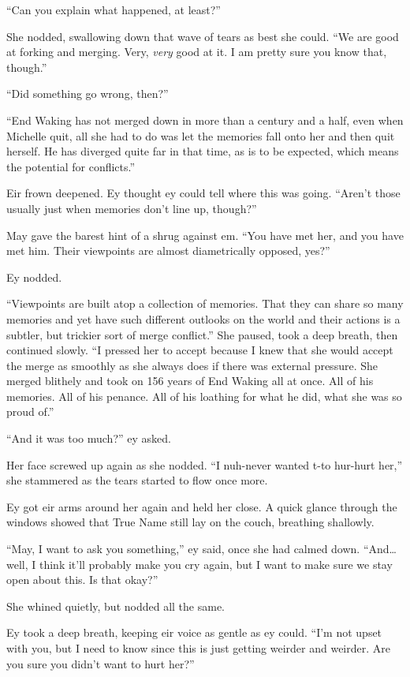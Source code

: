 ``Can you explain what happened, at least?''

She nodded, swallowing down that wave of tears as best she could. ``We are good at forking and merging. Very, \emph{very} good at it. I am pretty sure you know that, though.''

``Did something go wrong, then?''

``End Waking has not merged down in more than a century and a half, even when Michelle quit, all she had to do was let the memories fall onto her and then quit herself. He has diverged quite far in that time, as is to be expected, which means the potential for conflicts.''

Eir frown deepened. Ey thought ey could tell where this was going. ``Aren't those usually just when memories don't line up, though?''

May gave the barest hint of a shrug against em. ``You have met her, and you have met him. Their viewpoints are almost diametrically opposed, yes?''

Ey nodded.

``Viewpoints are built atop a collection of memories. That they can share so many memories and yet have such different outlooks on the world and their actions is a subtler, but trickier sort of merge conflict.'' She paused, took a deep breath, then continued slowly. ``I pressed her to accept because I knew that she would accept the merge as smoothly as she always does if there was external pressure. She merged blithely and took on 156 years of End Waking all at once. All of his memories. All of his penance. All of his loathing for what he did, what she was so proud of.''

``And it was too much?'' ey asked.

Her face screwed up again as she nodded. ``I nuh-never wanted t-to hur-hurt her,'' she stammered as the tears started to flow once more.

Ey got eir arms around her again and held her close. A quick glance through the windows showed that True Name still lay on the couch, breathing shallowly.

``May, I want to ask you something,'' ey said, once she had calmed down. ``And\ldots well, I think it'll probably make you cry again, but I want to make sure we stay open about this. Is that okay?''

She whined quietly, but nodded all the same.

Ey took a deep breath, keeping eir voice as gentle as ey could. ``I'm not upset with you, but I need to know since this is just getting weirder and weirder. Are you sure you didn't want to hurt her?''

